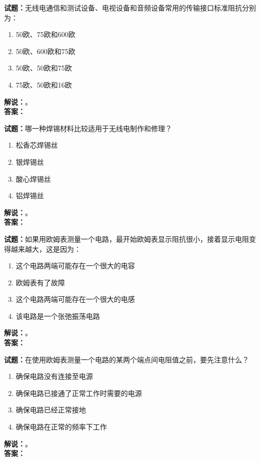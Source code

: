 \documentclass{ctexbook}
\begin{document}
\bigskip

\noindent\textbf{试题：}无线电通信和测试设备、电视设备和音频设备常用的传输接口标准阻抗分别为：
\begin{enumerate}[leftmargin=3em]
  \item 50欧、75欧和600欧
  \item 50欧、600欧和75欧
  \item 50欧、50欧和75欧
  \item 75欧、50欧和16欧
\end{enumerate}
\noindent\textbf{解说：}\textbf{}。\\\noindent\textbf{答案：}

\bigskip

\noindent\textbf{试题：}哪一种焊锡材料比较适用于无线电制作和修理？
\begin{enumerate}[leftmargin=3em]
  \item 松香芯焊锡丝
  \item 银焊锡丝
  \item 酸心焊锡丝
  \item 铝焊锡丝
\end{enumerate}
\noindent\textbf{解说：}\textbf{}。\\\noindent\textbf{答案：}

\bigskip

\noindent\textbf{试题：}如果用欧姆表测量一个电路，最开始欧姆表显示阻抗很小，接着显示电阻变得越来越大，这是因为：
\begin{enumerate}[leftmargin=3em]
  \item 这个电路两端可能存在一个很大的电容
  \item 欧姆表有了故障
  \item 这个电路两端可能存在一个很大的电感
  \item 该电路是一个张弛振荡电路
\end{enumerate}
\noindent\textbf{解说：}\textbf{}。\\\noindent\textbf{答案：}

\bigskip

\noindent\textbf{试题：}在使用欧姆表测量一个电路的某两个端点间电阻值之前，要先注意什么？
\begin{enumerate}[leftmargin=3em]
  \item 确保电路没有连接至电源
  \item 确保电路已接通了正常工作时需要的电源
  \item 确保电路已经正常接地
  \item 确保电路在正常的频率下工作
\end{enumerate}
\noindent\textbf{解说：}\textbf{}。\\\noindent\textbf{答案：}
\end{document}
